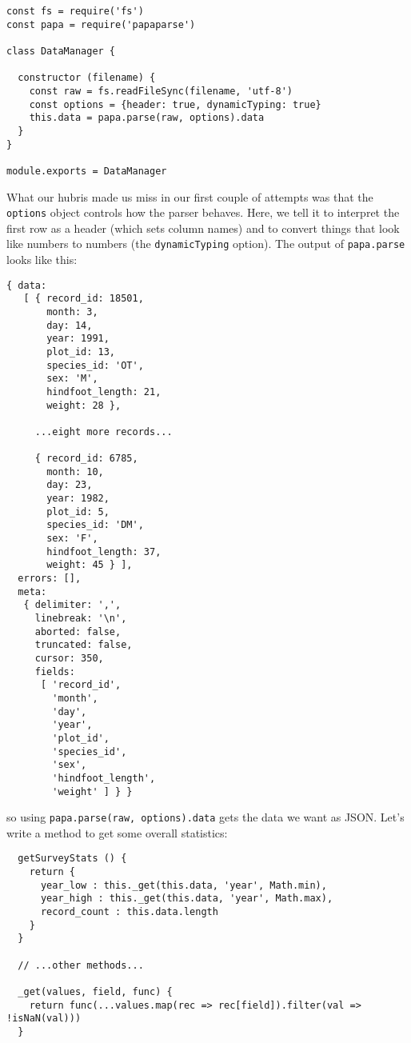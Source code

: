 \begin{verbatim}
const fs = require('fs')
const papa = require('papaparse')

class DataManager {

  constructor (filename) {
    const raw = fs.readFileSync(filename, 'utf-8')
    const options = {header: true, dynamicTyping: true}
    this.data = papa.parse(raw, options).data
  }
}

module.exports = DataManager
\end{verbatim}

What our hubris made us miss in our first couple of attempts was that
the \texttt{options} object controls how the parser behaves.
Here,
we tell it to interpret the first row as a header (which sets column names)
and to convert things that look like numbers to numbers (the \texttt{dynamicTyping} option).
The output of \texttt{papa.parse} looks like this:

\begin{verbatim}
{ data:
   [ { record_id: 18501,
       month: 3,
       day: 14,
       year: 1991,
       plot_id: 13,
       species_id: 'OT',
       sex: 'M',
       hindfoot_length: 21,
       weight: 28 },

     ...eight more records...

     { record_id: 6785,
       month: 10,
       day: 23,
       year: 1982,
       plot_id: 5,
       species_id: 'DM',
       sex: 'F',
       hindfoot_length: 37,
       weight: 45 } ],
  errors: [],
  meta:
   { delimiter: ',',
     linebreak: '\n',
     aborted: false,
     truncated: false,
     cursor: 350,
     fields:
      [ 'record_id',
        'month',
        'day',
        'year',
        'plot_id',
        'species_id',
        'sex',
        'hindfoot_length',
        'weight' ] } }
\end{verbatim}

\noindent
so using \texttt{papa.parse(raw,\ options).data} gets the data we want as JSON.
Let's write a method to get some overall statistics:

\begin{verbatim}
  getSurveyStats () {
    return {
      year_low : this._get(this.data, 'year', Math.min),
      year_high : this._get(this.data, 'year', Math.max),
      record_count : this.data.length
    }
  }

  // ...other methods...

  _get(values, field, func) {
    return func(...values.map(rec => rec[field]).filter(val => !isNaN(val)))
  }
\end{verbatim}

